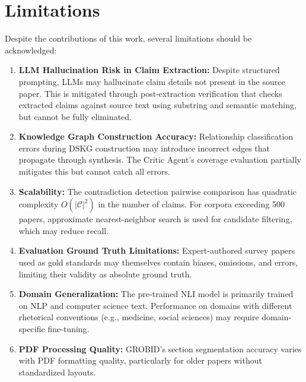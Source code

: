 \section{Limitations}

Despite the contributions of this work, several limitations should be acknowledged:

\begin{enumerate}
    \item \textbf{LLM Hallucination Risk in Claim Extraction:} Despite structured prompting, LLMs may hallucinate claim details not present in the source paper. This is mitigated through post-extraction verification that checks extracted claims against source text using substring and semantic matching, but cannot be fully eliminated.

    \item \textbf{Knowledge Graph Construction Accuracy:} Relationship classification errors during DSKG construction may introduce incorrect edges that propagate through synthesis. The Critic Agent's coverage evaluation partially mitigates this but cannot catch all errors.

    \item \textbf{Scalability:} The contradiction detection pairwise comparison has quadratic complexity $O(|\mathcal{C}|^2)$ in the number of claims. For corpora exceeding 500 papers, approximate nearest-neighbor search is used for candidate filtering, which may reduce recall.

    \item \textbf{Evaluation Ground Truth Limitations:} Expert-authored survey papers used as gold standards may themselves contain biases, omissions, and errors, limiting their validity as absolute ground truth.

    \item \textbf{Domain Generalization:} The pre-trained NLI model is primarily trained on NLP and computer science text. Performance on domains with different rhetorical conventions (e.g., medicine, social sciences) may require domain-specific fine-tuning.

    \item \textbf{PDF Processing Quality:} GROBID's section segmentation accuracy varies with PDF formatting quality, particularly for older papers without standardized layouts.
\end{enumerate}

